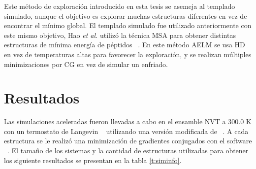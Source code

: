 Este método de exploración introducido en esta tesis se asemeja al templado
simulado, aunque el objetivo es explorar muchas estructuras diferentes en vez de 
encontrar el mínimo global. El templado simulado fue utilizado anteriormente
con este mismo objetivo, Hao \textit{et al.} utilizó la técnica MSA para obtener
distintas estructuras de mínima energía de péptidos ~\cite{hao2015}. En este 
método AELM se usa HD en vez de temperaturas altas para favorecer la exploración,
y se realizan múltiples minimizaciones por CG en vez de simular un enfriado. 


\section{Resultados}

Las simulaciones aceleradas fueron llevadas a cabo en el ensamble NVT a 300.0 K
con un termostato de Langevin ~\cite{schneider1978} utilizando una versión 
modificada de  ~\cite{gems}. A cada estructura se le realizó una 
minimización de gradientes conjugados con el software  
~\cite{lammps1, lammps2}. El tamaño de los sistemas y la cantidad de estructuras 
utilizadas para obtener los siguiente resultados se presentan en la tabla 
\ref{t:siminfo}.
\begin{table}[h]
    \centering
    \caption{Información del conjunto de datos.}
    \setlength\extrarowheight{2pt}
    \label{t:siminfo}
\end{table}

